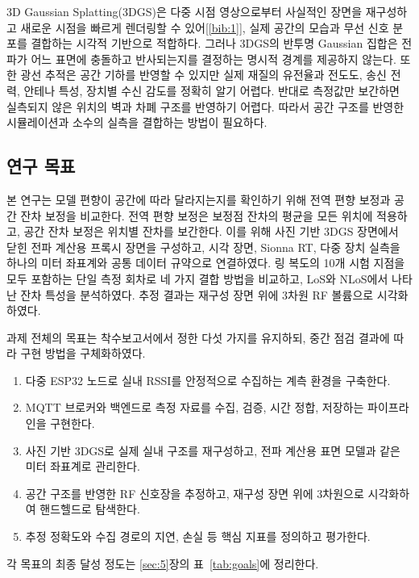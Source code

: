 \documentclass[11pt,a4paper]{article}
\begin{document}
3D Gaussian Splatting(3DGS)은 다중 시점 영상으로부터 사실적인 장면을 재구성하고 새로운 시점을 빠르게 렌더링할 수 있어[\ref{bib:1}], 실제 공간의
모습과 무선 신호 분포를 결합하는 시각적 기반으로 적합하다. 그러나 3DGS의 반투명 Gaussian 집합은 전파가 어느 표면에 충돌하고 반사되는지를 결정하는 명시적 경계를
제공하지 않는다. 또한 광선 추적은 공간 기하를 반영할 수 있지만 실제 재질의 유전율과 전도도, 송신 전력, 안테나 특성, 장치별 수신 감도를 정확히 알기 어렵다. 반대로 측정값만
보간하면 실측되지 않은 위치의 벽과 차폐 구조를 반영하기 어렵다. 따라서 공간 구조를 반영한 시뮬레이션과 소수의 실측을 결합하는 방법이 필요하다.

\subsection{연구 목표}

본 연구는 모델 편향이 공간에 따라 달라지는지를 확인하기 위해 전역 편향 보정과 공간 잔차 보정을 비교한다. 전역 편향 보정은 보정점 잔차의 평균을 모든 위치에 적용하고, 공간
잔차 보정은 위치별 잔차를 보간한다. 이를 위해 사진 기반 3DGS 장면에서 닫힌 전파 계산용 프록시 장면을 구성하고, 시각 장면, Sionna RT, 다중 장치 실측을 하나의 미터
좌표계와 공통 데이터 규약으로 연결하였다. 링 복도의 10개 시험 지점을 모두 포함하는 단일 측정 회차로 네 가지 결합 방법을 비교하고, LoS와 NLoS에서 나타난 잔차 특성을
분석하였다. 추정 결과는 재구성 장면 위에 3차원 RF 볼륨으로 시각화하였다.

과제 전체의 목표는 착수보고서에서 정한 다섯 가지를 유지하되, 중간 점검 결과에 따라 구현 방법을 구체화하였다.

\begin{enumerate}[leftmargin=2em, itemsep=2pt, topsep=2pt]
  \item 다중 ESP32 노드로 실내 RSSI를 안정적으로 수집하는 계측 환경을 구축한다.
  \item MQTT 브로커와 백엔드로 측정 자료를 수집, 검증, 시간 정합, 저장하는 파이프라인을 구현한다.
  \item 사진 기반 3DGS로 실제 실내 구조를 재구성하고, 전파 계산용 표면 모델과 같은 미터 좌표계로 관리한다.
  \item 공간 구조를 반영한 RF 신호장을 추정하고, 재구성 장면 위에 3차원으로 시각화하여 핸드헬드로 탐색한다.
  \item 추정 정확도와 수집 경로의 지연, 손실 등 핵심 지표를 정의하고 평가한다.
\end{enumerate}

각 목표의 최종 달성 정도는 \ref{sec:5}장의 표~\ref{tab:goals}에 정리한다.
\end{document}
